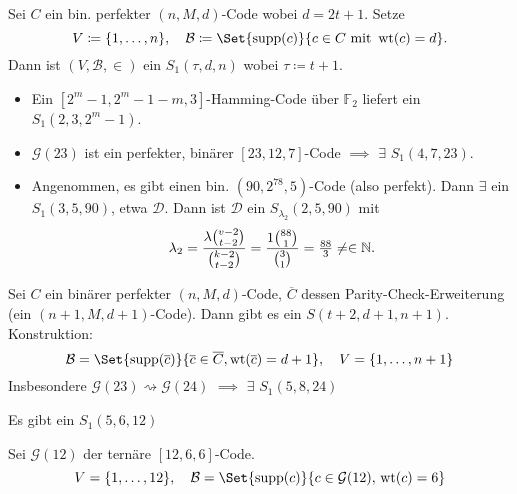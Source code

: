 \documentclass{cheat-sheet}
\newcommand{\F}{\mathbb{F}} %
\DeclareMathOperator{\wt}{wt} %
\newcommand{\Golay}{\mathcal{G}} %
\newcommand{\Design}{\mathcal{D}} %
\newcommand{\Blocks}{\mathcal{B}} %
\begin{document}

\begin{satz}
  Sei $C$ ein bin. perfekter $(n, M, d)$-Code wobei $d = 2t+1$.
  Setze
  \[
    V \coloneqq \{ 1, \ldots, n \}, \quad
    \Blocks \coloneqq \Set{\supp(c)}{c \in C \text{ mit } \wt(c) = d}.
  \]
  Dann ist $(V, \Blocks, {\in})$ ein $S_1(\tau, d, n)$ wobei $\tau \coloneqq t+1$.
\end{satz}

\begin{bspe}
  \begin{itemize}
    \item Ein $[2^m-1, 2^m-1-m, 3]$-Hamming-Code über $\F_2$ liefert ein $S_1(2, 3, 2^m-1)$.
    \item $\Golay(23)$ ist ein perfekter, binärer $[23, 12, 7]$-Code $\implies$ $\exists$ $S_1(4, 7, 23)$.
    \item Angenommen, es gibt einen bin. $(90, 2^{78}, 5)$-Code (also perfekt).
    Dann $\exists$ ein $S_1(3, 5, 90)$, etwa $\Design$.
    Dann ist $\Design$ ein $S_{\lambda_2}(2, 5, 90)$ mit
    \[ \lambda_2 = \frac{\lambda \binom{v-2}{t-2}}{\binom{k-2}{t-2}} = \frac{1 \binom{88}{1}}{\binom{3}{1}} = \tfrac{88}{3} \neq\in \mathbb{N}. \]
  \end{itemize}
\end{bspe}

\begin{bem}
  Sei $C$ ein binärer perfekter $(n, M, d)$-Code, $\overline{C}$ dessen Parity-Check-Erweiterung (ein $(n+1, M, d+1)$-Code).
  Dann gibt es ein $S(t+2, d+1, n+1)$.
  Konstruktion:
  \[
    \Blocks = \Set{\supp(\overline{c})}{\overline{c} \in \overline{C}, \wt(\overline{c}) = d+1}, \quad
    V = \{ 1, \ldots, n+1 \}
  \]
  Insbesondere $\Golay(23) \rightsquigarrow \Golay(24)$ $\implies$ $\exists$ $S_1(5, 8, 24)$
\end{bem}

\begin{satz}
  Es gibt ein $S_1(5, 6, 12)$
\end{satz}

\begin{konstr}
  Sei $\Golay(12)$ der ternäre $[12,6,6]$-Code.
  \[
    V = \{ 1, \ldots, 12 \}, \quad
    \Blocks = \Set{\supp(c)}{c \in \Golay(12), \, \wt(c) = 6}
  \]
\end{konstr}
\end{document}
